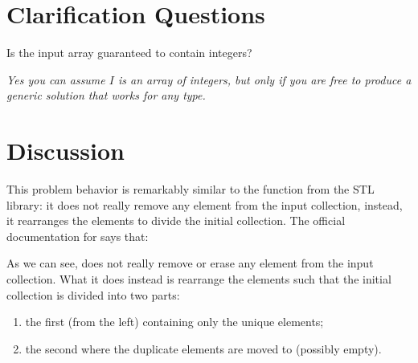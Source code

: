 \section{Clarification Questions}

\begin{QandA}
	\begin{questionitem} \begin{question} Is the input array guaranteed to contain integers?   \end{question} 	 
    \begin{answered}
		\textit{Yes you can assume $I$ is an array of integers, but only if you are free to produce a generic solution that works for any type.}
	\end{answered} \end{questionitem}	
\end{QandA}

\section{Discussion}
\label{remove_duplicated_sorted_array_inplace:sec:discussion}
This problem behavior is remarkably similar to the function  from the STL library: it does not really remove any element from the input collection, instead, it rearranges the elements to divide the initial collection. 
The official documentation for  says that:


As we can see,  does not really remove or erase any element from the input collection. 
What it does instead is rearrange the elements such that the initial collection is divided into
two parts:
\begin{enumerate}
	\item the first (from the left) containing only the unique elements;
	\item the second where the duplicate elements are moved to (possibly empty).
\end{enumerate}


